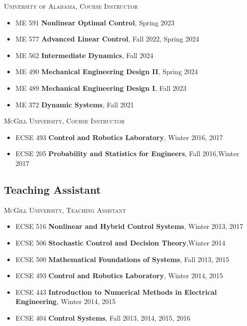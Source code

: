 \documentclass{article}
\begin{document}
\vspace{-5pt}
\noindent
\textsc{University of Alabama}, \hfill \textsc{Course Instructor}
\vspace{-5pt}
\begin{itemize}
\setlength\itemsep{-2 pt}
\item[] ME 591 \textbf{Nonlinear Optimal Control}, \hfill Spring 2023
\item[] ME 577 \textbf{Advanced Linear Control}, \hfill Fall 2022, Spring 2024
\item[] ME 562 \textbf{Intermediate Dynamics}, \hfill Fall 2024
\item[] ME 490 \textbf{Mechanical Engineering Design II}, \hfill Spring 2024
\item[] ME 489 \textbf{Mechanical Engineering Design I}, \hfill Fall 2023
\item[] ME 372 \textbf{Dynamic Systems}, \hfill Fall 2021
\end{itemize}

\vspace{-5pt}
\noindent
\textsc{McGill University}, \hfill \textsc{Course Instructor}
\vspace{-5pt}
\begin{itemize}
\setlength\itemsep{-2 pt}
\item[] ECSE 493 \textbf{Control and Robotics Laboratory}, \hfill Winter 2016, 2017
\item[] ECSE 205 \textbf{Probability and Statistics for Engineers}, \hfill Fall 2016,Winter 2017
\end{itemize}

\vspace{-18pt}

\subsection*{Teaching Assistant}
\vspace{-5pt}
\noindent
\textsc{McGill University}, \hfill \textsc{Teaching Assistant}
\vspace{-5pt}
\begin{itemize}
\setlength\itemsep{-2 pt}
\item[] ECSE 516 \textbf{Nonlinear and Hybrid Control Systems}, \hfill{Winter 2013, 2017}
\item[] ECSE 506 \textbf{Stochastic Control and Decision Theory},\hfill {Winter 2014}
\item[] ECSE 500 \textbf{Mathematical Foundations of Systems}, \hfill {Fall 2013, 2015}
\item[] ECSE 493 \textbf{Control and Robotics Laboratory}, \hfill {Winter 2014, 2015}
\item[] ECSE 443 \textbf{Introduction to Numerical Methods in Electrical Engineering}, \hfill {Winter 2014, 2015}
\item[] ECSE 404 \textbf{Control Systems}, \hfill\textmd{Fall 2013, 2014, 2015, 2016}
\end{itemize}
\end{document}
